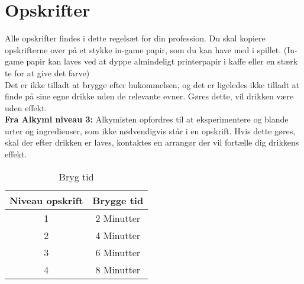 \chapter{Opskrifter}
Alle opskrifter findes i dette regelsæt for din profession. Du skal kopiere opskrifterne over på et stykke in-game papir, som du kan have med i spillet. (In-game papir kan laves ved at dyppe almindeligt printerpapir i kaffe eller en stærk te for at give det farve)\\
Det er ikke tilladt at brygge efter hukommelsen, og det er ligeledes ikke tilladt at finde på sine egne drikke uden de relevante evner. Gøres dette, vil drikken være uden effekt.\\
\textbf{Fra Alkymi niveau 3:} Alkymisten opfordres til at eksperimentere og blande urter og ingredienser, som ikke nødvendigvis står i en opskrift. Hvis dette gøres, skal der efter drikken er laves, kontaktes en arrangør der vil fortælle dig drikkens effekt.
\begin{table}[H]
    \centering
    \begin{tabular}{|c|c|}
    \hline
    \rowcolor{cerulean!80}
        Niveau opskrift & Brygge tid \\\hline
        1 & 2 Minutter\\\hline
        2 & 4 Minutter \\\hline
        3 & 6 Minutter \\\hline
        4 & 8 Minutter \\\hline
    \end{tabular}
    \caption{Bryg tid}
    \label{tab:my_label}
\end{table}

